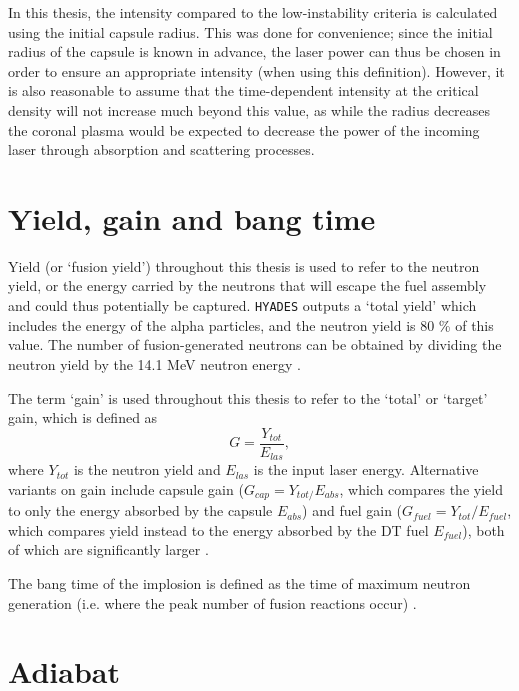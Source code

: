 In this thesis, the intensity compared to the low-instability criteria is calculated using the initial capsule radius. This was done for convenience; since the initial radius of the capsule is known in advance, the laser power can thus be chosen in order to ensure an appropriate intensity (when using this definition). However, it is also reasonable to assume that the time-dependent intensity at the critical density will not increase much beyond this value, as while the radius decreases the coronal plasma would be expected to decrease the power of the incoming laser through absorption and scattering processes.

\section{Yield, gain and bang time}

Yield (or `fusion yield') throughout this thesis is used to refer to the neutron yield, or the energy carried by the neutrons that will escape the fuel assembly and could thus potentially be captured. \texttt{HYADES} outputs a `total yield' which includes the energy of the alpha particles, and the neutron yield is 80 \% of this value. The number of fusion-generated neutrons can be obtained by dividing the neutron yield by the 14.1 MeV neutron energy \cite{Atzeni2008}.

The term `gain' is used throughout this thesis to refer to the `total' or `target' gain, which is defined as \begin{equation} G = \frac{Y_{tot}}{E_{las}}, \end{equation} where $Y_{tot}$ is the neutron yield and $E_{las}$ is the input laser energy. Alternative variants on gain include capsule gain ($G_{cap} = Y_{tot / }E_{abs}$, which compares the yield to only the energy absorbed by the capsule $E_{abs}$) and fuel gain ($G_{fuel} = Y_{tot} / E_{fuel}$, which compares yield instead to the energy absorbed by the DT fuel $E_{fuel}$), both of which are significantly larger \cite{Atzeni2008, Abu-Shawareb2022}.

The bang time of the implosion is defined as the time of maximum neutron generation (i.e. where the peak number of fusion reactions occur) \cite{Craxton2015}.

\section{Adiabat}


